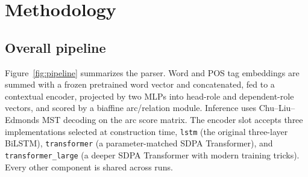 \section{Methodology}
\label{sec:method}

\subsection{Overall pipeline}
\label{sec:method-overall}

Figure~\ref{fig:pipeline} summarizes the parser. Word and POS tag embeddings are summed with a frozen pretrained word vector and concatenated, fed to a contextual encoder, projected by two MLPs into head-role and dependent-role vectors, and scored by a biaffine arc/relation module. Inference uses Chu--Liu--Edmonds MST decoding on the arc score matrix. The encoder slot accepts three implementations selected at construction time, \texttt{lstm} (the original three-layer BiLSTM), \texttt{transformer} (a parameter-matched SDPA Transformer), and \texttt{transformer\_large} (a deeper SDPA Transformer with modern training tricks). Every other component is shared across runs.

